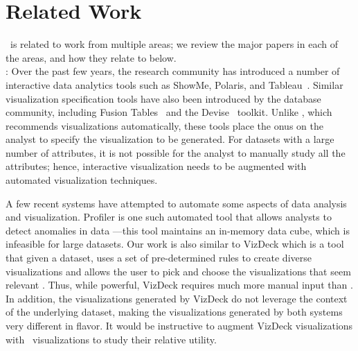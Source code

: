 

\section{Related Work}
\label{sec:related_work}
\VizRecDB\ is related to work from multiple areas;
we review the major papers in each of the areas, and how they relate to
\VizRecDB below. \\

:
Over the past few years, the research community has introduced a number of
interactive data analytics tools such as ShowMe, Polaris, and 
Tableau~\cite{DBLP:journals/cacm/StolteTH08, DBLP:journals/tvcg/MackinlayHS07}.
Similar visualization specification tools have also been introduced by the
database community, including Fusion
Tables~\cite{DBLP:conf/sigmod/GonzalezHJLMSSG10} and the
Devise~\cite{DBLP:conf/sigmod/LivnyRBCDLMW97} toolkit. 
Unlike \VizRecDB, which recommends visualizations automatically, these tools place
the onus on the analyst to specify the visualization to be generated.
For datasets with a large number of attributes, it is not possible
for the analyst to manually study all the attributes; hence, interactive
visualization needs to be augmented with automated visualization techniques.

A few recent systems have attempted to automate some aspects of data analysis
and visualization. Profiler is one such automated tool that allows analysts to
detect anomalies in data \cite{DBLP:conf/AVI/KandelPPHH12}---this tool
maintains an in-memory data cube, which is infeasible for large datasets.
Our work is also similar to VizDeck which is a tool that given a dataset, uses a
set of pre-determined rules to create diverse visualizations and
allows the user to pick and choose the visualizations that seem relevant
\cite{DBLP:conf/sigmod/KeyHPA12}.
Thus, while powerful, VizDeck requires much more manual input than \VizRecDB. 
In addition, the visualizations generated by VizDeck do not leverage the
context of the underlying dataset, making the visualizations generated by
both systems very different in flavor. 
It would be instructive to augment
VizDeck visualizations with \VizRecDB\ visualizations to study their relative
utility.
 \\

